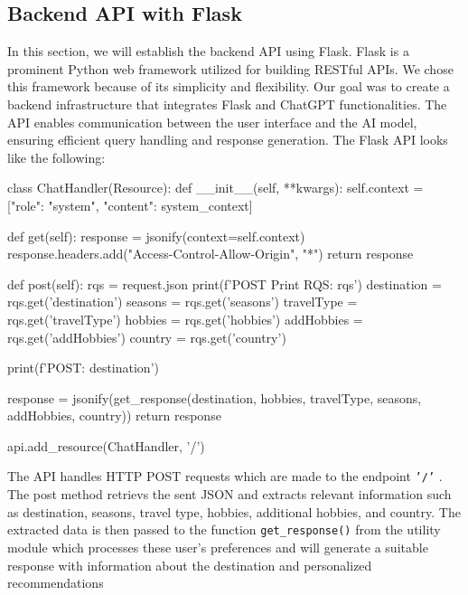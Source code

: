 \documentclass[english,notitlepage,smartquotes]{hgbreport}
\begin{document}
\subsection{Backend API with Flask}\label{Backend}
In this section, we will establish the backend API using Flask. Flask is a prominent Python web framework utilized for building RESTful APIs. We chose this framework because of its simplicity and flexibility. Our goal was to create a backend infrastructure that integrates Flask and ChatGPT functionalities. The API enables communication between the user interface and the AI model, ensuring efficient query handling and response generation. The Flask API looks like the following:
\begin{PythonCode}
class ChatHandler(Resource):
	def __init__(self, **kwargs):
		self.context = [{"role": "system", "content": system_context}]

	def get(self):
		response = jsonify(context=self.context)
		response.headers.add("Access-Control-Allow-Origin", "*")
		return response

	def post(self):
		rqs = request.json
		print(f'POST Print RQS: {rqs}\n')
		destination = rqs.get('destination')
		seasons = rqs.get('seasons')
		travelType = rqs.get('travelType')
		hobbies = rqs.get('hobbies')
		addHobbies = rqs.get('addHobbies')
		country = rqs.get('country')

		print(f'POST: {destination}\n')
		
		response = jsonify(get_response(destination, hobbies, travelType, seasons,
			addHobbies, country))
		return response

api.add_resource(ChatHandler, '/')
\end{PythonCode}
The API handles HTTP POST requests which are made to the endpoint \texttt{'/'} . The post method retrievs the sent JSON and extracts relevant information such as destination, seasons, travel type, hobbies, additional hobbies, and country. The extracted data is then passed to the function \texttt{get\_response()} from the utility module which processes these user's preferences and will generate a suitable response with information about the destination and personalized recommendations
\end{document}
